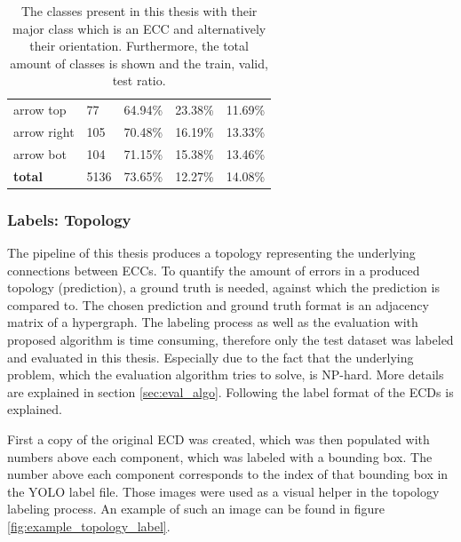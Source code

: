 \begin{table}
\begin{center}
\begin{tabular}{l|l|l|l|l|}
    arrow top               & 77     &  64.94\%  &   23.38\%  & 11.69\% \\
    arrow right             & 105    &  70.48\%  &   16.19\%  & 13.33\% \\
    arrow bot               & 104    &  71.15\%  &   15.38\%  & 13.46\% \\
    \hline
    \textbf{total}          & 5136   &  73.65\%  &   12.27\%  & 14.08\% \\
\end{tabular}
\caption{The classes present in this thesis with their major class which is an \ac{ECC} and alternatively their orientation. Furthermore, the total amount of classes is shown and the train, valid, test ratio.}
\label{tab:yolo_classes}
\end{center}
\end{table}

\subsubsection{Labels: Topology}
\label{sec:hypergraph_topology}

The pipeline of this thesis produces a topology representing the underlying connections between \acp{ECC}.
To quantify the amount of errors in a produced topology (prediction), a ground truth is needed, against which the prediction is compared to.
The chosen prediction and ground truth format is an adjacency matrix of a hypergraph.
The labeling process as well as the evaluation with proposed algorithm is time consuming, therefore only the test dataset was labeled and evaluated in this thesis.
Especially due to the fact that the underlying problem, which the evaluation algorithm tries to solve, is NP-hard.
More details are explained in section \ref{sec:eval_algo}.
Following the label format of the \acp{ECD} is explained.

First a copy of the original \ac{ECD} was created, which was then populated with numbers above each component, which was labeled with a bounding box.
The number above each component corresponds to the index of that bounding box in the YOLO label file.
Those images were used as a visual helper in the topology labeling process.
An example of such an image can be found in figure \ref{fig:example_topology_label}.

